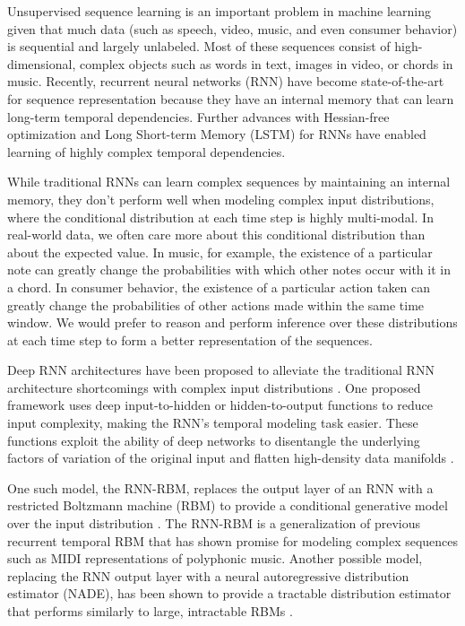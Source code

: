 Unsupervised sequence learning is an important problem in machine learning given that much data (such as speech, video,  music, and even consumer behavior) is sequential and largely unlabeled. Most of these sequences consist of high-dimensional, complex objects such as words in text, images in video, or chords in music. Recently, recurrent neural networks (RNN) \cite{rnn} have become state-of-the-art for sequence representation because they have an internal memory that can learn long-term temporal dependencies. Further advances with Hessian-free optimization and Long Short-term Memory (LSTM) for RNNs \cite{hessian_free, lstm} have enabled learning of highly complex temporal dependencies.

While traditional RNNs can learn complex sequences by maintaining an internal memory, they don't perform well when modeling complex input distributions, where the conditional distribution at each time step is highly multi-modal. In real-world data, we often care more about this conditional distribution than about the expected value. In music, for example, the existence of a particular note can greatly change the probabilities with which other notes occur with it in a chord. In consumer behavior, the existence of a particular action taken can greatly change the probabilities of other actions made within the same time window. We would prefer to reason and perform inference over these distributions at each time step to form a better representation of the sequences.

Deep RNN architectures have been proposed to alleviate the traditional RNN architecture shortcomings with complex input distributions \cite{deep_rnn}. One proposed framework uses deep input-to-hidden or hidden-to-output functions to reduce input complexity, making the RNN's temporal modeling task easier. These functions exploit the ability of deep networks to disentangle the underlying factors of variation of the original input and flatten high-density data manifolds \cite{goodfellow09, glorot11, bengio13}.

One such model, the RNN-RBM, replaces the output layer of an RNN with a restricted Boltzmann machine (RBM) to provide a conditional generative model over the input distribution \cite{rnnrbm,boulanger14}. The RNN-RBM is a generalization of previous recurrent temporal RBM \cite{rtrbm} that has shown promise for modeling complex sequences such as MIDI representations of polyphonic music. Another possible model, replacing the RNN output layer with a neural autoregressive distribution estimator (NADE),  has been shown to provide a tractable distribution estimator that performs similarly to large, intractable RBMs \cite{nade}.

